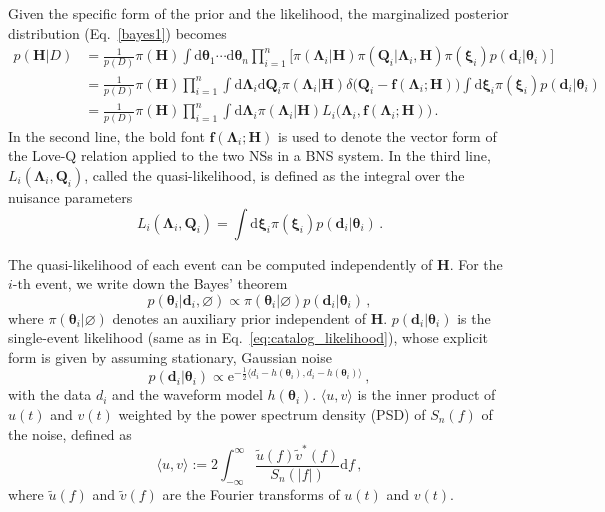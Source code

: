 \documentclass[a4paper,11pt]{article}
\begin{document}
Given the specific form of the prior and the likelihood, the marginalized posterior distribution (Eq.~\eqref{bayes1}) becomes
\begin{equation}
\label{hierarchical bayes}
\begin{aligned}
p(\bm{H}|D)&=\frac{1}{p(D)}\pi(\bm{H})\int \text{d}\bm{\theta}_1\cdots\text{d}\bm{\theta}_n \prod_{i=1}^n \big[\pi(\bm{\Lambda}_i|\bm{H})\pi(\bm{Q}_i|\bm{\Lambda}_i,\bm{H})\pi(\bm{\xi}_i)p(\bm{d}_i|\bm{\theta}_i)\big] \\
&=\frac{1}{p(D)} \pi(\bm{H}) \prod_{i=1}^n
\int \text{d}\bm{\Lambda}_i\text{d}\bm{Q}_i\pi(\bm{\Lambda}_i|\bm{H})\delta\big(\bm{Q}_i-\bm{f}(\bm{\Lambda}_i;\bm{H})\big) \int \text{d}\bm{\xi}_i \pi(\bm{\xi}_i)p(\bm{d}_i|\bm{\theta}_i)\\
&=\frac{1}{p(D)} \pi(\bm{H}) \prod_{i=1}^n
\int \text{d}\bm{\Lambda}_i\pi(\bm{\Lambda}_i|\bm{H})L_i\big(\bm{\Lambda}_i,\bm{f}(\bm{\Lambda}_i;\bm{H})\big)\,.
\end{aligned}
\end{equation}
In the second line, the bold font $\bm{f}(\bm{\Lambda}_i;\bm{H})$ is used to denote the vector form
of the Love-Q relation applied to the two NSs in a BNS system. In the third line,
$L_i(\bm{\Lambda}_i,\bm{Q}_i)$, called the quasi-likelihood,
 is defined as the integral over the nuisance
parameters
\begin{equation}
\label{quasi-likelihood}
    L_i(\bm{\Lambda}_i,\bm{Q}_i)=\int \text{d}\bm{\xi}_i \pi(\bm{\xi}_i)p(\bm{d}_i|\bm{\theta}_i)\,.
\end{equation}

The quasi-likelihood of each event can be 
computed independently of $\bm{H}$. For the $i\text{-th}$ event, we write down
the Bayes' theorem
\begin{equation}
\label{single bayes}
    p(\bm{\theta}_i|\bm{d}_i, \varnothing)\propto \pi(\bm{\theta}_i|\varnothing)p(\bm{d}_i|\bm{\theta}_i)\,,
\end{equation}
where $\pi(\bm{\theta}_i|\varnothing)$ denotes an auxiliary prior 
independent of $\bm{H}$. $p(\bm{d}_i|\bm{\theta}_i)$ is the single-event
likelihood (same as in Eq.~\eqref{eq:catalog_likelihood}), whose explicit form is
 given by assuming stationary, Gaussian noise~\cite{Finn:1992wt}
\begin{equation}
p(\bm{d}_i|\bm{\theta}_i)\propto \mathrm{e}^{-\frac{1}{2}\langle d_i-h(\bm{\theta}_i),d_i-h(\bm{\theta}_i)\rangle}\,,
\end{equation}
with the data $d_i$ and the waveform model $h(\bm{\theta}_i)$. $\langle u, v\rangle$ 
is the inner product of $u(t)$ and $v(t)$ weighted by the power spectrum density
(PSD) of $S_n(f)$ of the noise, defined as
\begin{equation}
    \langle u, v\rangle:= 2\int_{-\infty}^{\infty}\frac{\tilde{u}(f)\tilde{v}^{*}(f)}{S_n(|f|)} \text{d}f\,,
\end{equation}
where $\tilde{u}(f)$ and $\tilde{v}(f)$ are the Fourier transforms of $u(t)$ and $v(t)$.
\end{document}
